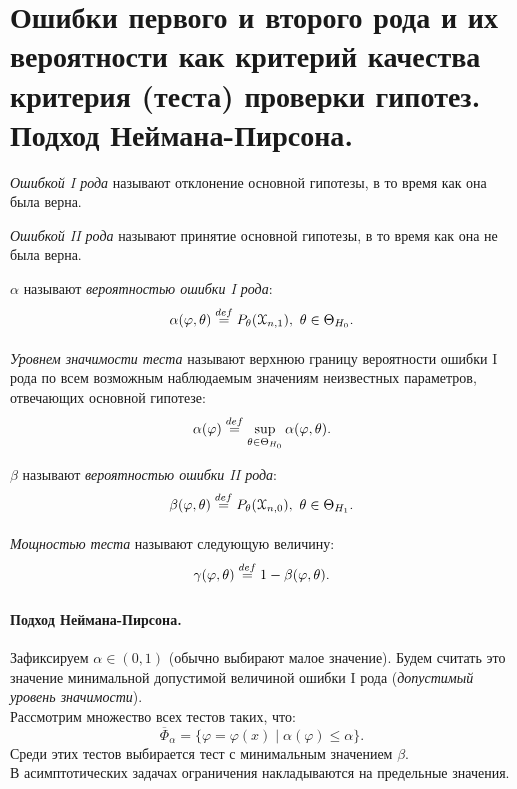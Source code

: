 \section{Ошибки первого и второго рода и их вероятности как критерий качества
критерия (теста) проверки гипотез. Подход Неймана-Пирсона.}

\begin{definition}
  \textit{Ошибкой I рода} называют отклонение основной гипотезы, в то
  время как она была верна.
\end{definition}

\begin{definition}
  \textit{Ошибкой II рода} называют принятие основной гипотезы, в то
  время как она не была верна.
\end{definition}

\begin{definition}
  $\alpha$ называют \textit{вероятностью ошибки I рода}:
  \[
    \alpha(\varphi, \theta) \overset{def}{\underset{}{=}} P_{\theta}(\mathcal{X}_{n, 1}),~
    \theta \in \Theta_{H_0}
  .\]
\end{definition}

\begin{definition}
  \textit{Уровнем значимости теста} называют верхнюю границу вероятности ошибки
  I рода по всем возможным наблюдаемым значениям неизвестных параметров,
  отвечающих основной гипотезе:
  \[
    \alpha(\varphi) \overset{def}{\underset{}{=}} \sup_{\theta \in \Theta_{H_0}} \alpha(\varphi, \theta)
  .\]
\end{definition}

\begin{definition}
  $\beta$ называют \textit{вероятностью ошибки II рода}:
  \[
    \beta(\varphi, \theta) \overset{def}{\underset{}{=}} P_{\theta}(\mathcal{X}_{n, 0}),~
    \theta \in \Theta_{H_1}
  .\]
\end{definition}

\begin{definition}
  \textit{Мощностью теста} называют следующую величину:
  \[
    \gamma(\varphi, \theta) \overset{def}{\underset{}{=}} 1 - \beta(\varphi, \theta)
  .\]
\end{definition}

\paragraph{Подход Неймана-Пирсона.}

Зафиксируем $\alpha \in (0, 1)$ (обычно выбирают малое значение). Будем считать
это значение минимальной допустимой величиной ошибки I рода (\textit{допустимый
уровень значимости}).\\
Рассмотрим множество всех тестов таких, что:
\[
  \overline{\Phi}_\alpha = \{\varphi = \varphi(x) \mid \alpha(\varphi) \leqslant
  \alpha\}
.\]
Среди этих тестов выбирается тест с минимальным значением $\beta$.\\
В асимптотических задачах ограничения накладываются на предельные значения.
